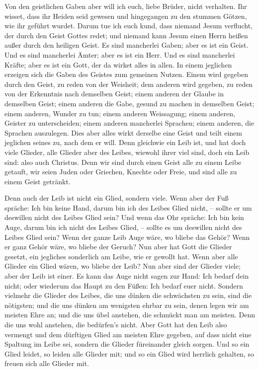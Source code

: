  Von den geistlichen Gaben aber will ich euch, liebe
Brüder, nicht verhalten.  Ihr wisset, dass ihr Heiden seid
gewesen und hingegangen zu den stummen Götzen, wie ihr geführt wurdet.
 Darum tue ich euch kund, dass niemand Jesum verflucht,
der durch den Geist Gottes redet; und niemand kann Jesum einen Herrn
heißen außer durch den heiligen Geist.  Es sind mancherlei
Gaben; aber es ist ein Geist.  Und es sind mancherlei
Ämter; aber es ist ein Herr.  Und es sind mancherlei
Kräfte; aber es ist ein Gott, der da wirket alles in allen.
 In einem jeglichen erzeigen sich die Gaben des Geistes
zum gemeinen Nutzen.  Einem wird gegeben durch den Geist,
zu reden von der Weisheit; dem anderen wird gegeben, zu reden von der
Erkenntnis nach demselben Geist;  einem anderen der Glaube
in demselben Geist; einem anderen die Gabe, gesund zu machen in
demselben Geist;  einem anderen, Wunder zu tun; einem
anderen Weissagung; einem anderen, Geister zu unterscheiden; einem
anderen mancherlei Sprachen; einem anderen, die Sprachen auszulegen.
 Dies aber alles wirkt derselbe eine Geist und teilt
einem jeglichen seines zu, nach dem er will.  Denn
gleichwie ein Leib ist, und hat doch viele Glieder, alle Glieder aber
des Leibes, wiewohl ihrer viel sind, doch ein Leib sind: also auch
Christus.  Denn wir sind durch einen Geist alle zu einem
Leibe getauft, wir seien Juden oder Griechen, Knechte oder Freie, und
sind alle zu einem Geist getränkt.

 Denn auch der Leib ist nicht ein Glied, sondern viele.
 Wenn aber der Fuß spräche: Ich bin keine Hand, darum bin
ich des Leibes Glied nicht, -- sollte er um deswillen nicht des Leibes
Glied sein?  Und wenn das Ohr spräche: Ich bin kein Auge,
darum bin ich nicht des Leibes Glied, -- sollte es um deswillen nicht
des Leibes Glied sein?  Wenn der ganze Leib Auge wäre, wo
bliebe das Gehör? Wenn er ganz Gehör wäre, wo bliebe der Geruch?
 Nun aber hat Gott die Glieder gesetzt, ein jegliches
sonderlich am Leibe, wie er gewollt hat.  Wenn aber alle
Glieder ein Glied wären, wo bliebe der Leib?  Nun aber
sind der Glieder viele; aber der Leib ist einer.  Es kann
das Auge nicht sagen zur Hand: Ich bedarf dein nicht; oder wiederum das
Haupt zu den Füßen: Ich bedarf euer nicht.  Sondern
vielmehr die Glieder des Leibes, die uns dünken die schwächsten zu sein,
sind die nötigsten;  und die uns dünken am wenigsten
ehrbar zu sein, denen legen wir am meisten Ehre an; und die uns übel
anstehen, die schmückt man am meisten.  Denn die uns wohl
anstehen, die bedürfen's nicht. Aber Gott hat den Leib also vermengt und
dem dürftigen Glied am meisten Ehre gegeben,  auf dass
nicht eine Spaltung im Leibe sei, sondern die Glieder füreinander gleich
sorgen.  Und so ein Glied leidet, so leiden alle Glieder
mit; und so ein Glied wird herrlich gehalten, so freuen sich alle
Glieder mit.

